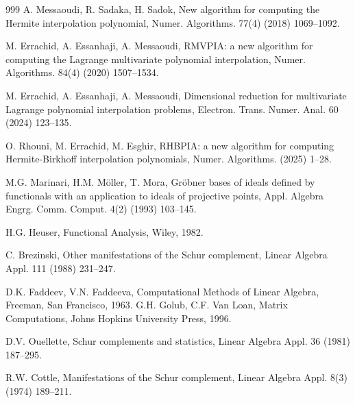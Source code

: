 \documentclass[preprint,12pt]{elsarticle}
\begin{document}
\begin{thebibliography}{999}
A. Messaoudi, R. Sadaka, H. Sadok, New algorithm for computing the Hermite interpolation polynomial, Numer. Algorithms. 77(4) (2018) 1069--1092.

M. Errachid, A. Essanhaji, A. Messaoudi, RMVPIA: a new algorithm for computing the Lagrange multivariate polynomial interpolation, Numer. Algorithms. 84(4) (2020) 1507--1534.

M. Errachid, A. Essanhaji, A. Messaoudi, Dimensional reduction for multivariate Lagrange polynomial interpolation problems, Electron. Trans. Numer. Anal. 60 (2024) 123--135. 

O. Rhouni, M. Errachid, M. Esghir, RHBPIA: a new algorithm for computing Hermite-Birkhoff interpolation polynomials, Numer. Algorithms. (2025) 1--28. 

M.G. Marinari, H.M. M\"{o}ller, T. Mora, Gr\"{o}bner bases of ideals defined by functionals with an application to ideals of projective points, Appl. Algebra Engrg. Comm. Comput. 4(2) (1993) 103--145.

H.G. Heuser, Functional Analysis, Wiley, 1982.

C. Brezinski, Other manifestations of the Schur complement, Linear Algebra Appl. 111 (1988) 231--247. 

 D.K. Faddeev, V.N. Faddeeva, Computational Methods of Linear Algebra, Freeman, San
Francisco, 1963.
 G.H. Golub, C.F. Van Loan, Matrix Computations, Johns Hopkins University Press, 1996.

 D.V. Ouellette, Schur complements and statistics, Linear Algebra Appl. 36 (1981) 187--295.

R.W. Cottle, Manifestations of the Schur complement, Linear Algebra Appl. 8(3)  (1974) 189--211.

\end{thebibliography}
\end{document}
